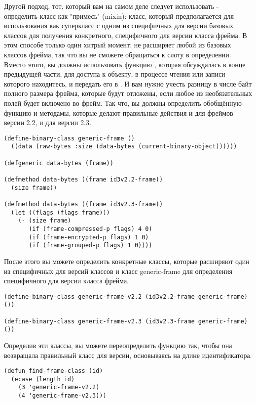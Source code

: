 Другой подход, тот, который вам на самом деле следует использовать - определить класс
 как "примесь" (mixin): класс, который предполагается для
использования как суперкласс с одним из специфичных для версии базовых классов для
получения конкретного, специфичного для версии класса фрейма. В этом способе только один
хитрый момент:  не расширяет любой из базовых классов фрейма, так что
вы не сможете обращаться к слоту  в определении. Вместо этого, вы должны
использовать функцию , которая обсуждалась в конце предыдущей
части, для доступа к объекту, в процессе чтения или записи которого находитесь, и передать
его в . И вам нужно учесть разницу в числе байт полного размера фрейма, которые
будут отложены, если любое из необязательных полей будет включено во фрейм. Так что, вы
должны определить обобщённую функцию  и методамы, которые делают
правильные действия и для фреймов версии 2.2, и для версии 2.3.

\begin{lstlisting}
(define-binary-class generic-frame ()
  ((data (raw-bytes :size (data-bytes (current-binary-object))))))

(defgeneric data-bytes (frame))

(defmethod data-bytes ((frame id3v2.2-frame))
  (size frame))

(defmethod data-bytes ((frame id3v2.3-frame))
  (let ((flags (flags frame)))
    (- (size frame)
       (if (frame-compressed-p flags) 4 0)
       (if (frame-encrypted-p flags) 1 0)
       (if (frame-grouped-p flags) 1 0))))
\end{lstlisting}

После этого вы можете определить конкретные классы, которые расширяют один из специфичных
для версий классов и класс generic-frame для определения специфичного для версии класса
фрейма.

\begin{lstlisting}
(define-binary-class generic-frame-v2.2 (id3v2.2-frame generic-frame) ())

(define-binary-class generic-frame-v2.3 (id3v2.3-frame generic-frame) ())
\end{lstlisting}

Определив эти классы, вы можете переопределить функцию  так, чтобы
она возвращала правильный класс для версии, основываясь на длине идентификатора.

\begin{lstlisting}
(defun find-frame-class (id)
  (ecase (length id)
    (3 'generic-frame-v2.2)
    (4 'generic-frame-v2.3)))
\end{lstlisting}


